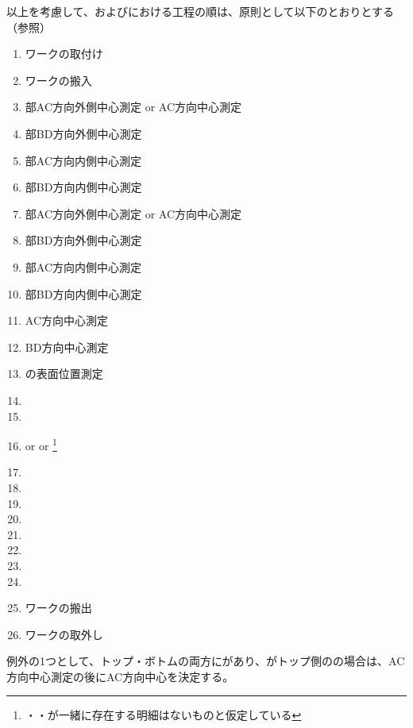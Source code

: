 \clearpage
以上を考慮して、\DMC および\MMC における工程の順は、原則として以下のとおりとする（参照）
\begin{enumerate}[label={\arabic*.}]
\item ワークの取付け
\item ワークの搬入
\item \BottomEndFace 部AC方向外側中心測定 or \BottomOutcut AC方向中心測定
\item \BottomEndFace 部BD方向外側中心測定
\item \BottomEndFace 部AC方向内側中心測定
\item \BottomEndFace 部BD方向内側中心測定
\item \TopEndFace 部AC方向外側中心測定 or \TopOutcut AC方向中心測定
\item \TopEndFace 部BD方向外側中心測定
\item \TopEndFace 部AC方向内側中心測定
\item \TopEndFace 部BD方向内側中心測定
\item \Keyway AC方向中心測定
\item \Keyway BD方向中心測定
\item \Dimple の表面位置測定
\item \DimpleMilling
\item \TopEndFacecutMilling
\item \TopOutcutMilling or \EndFaceBoringMilling or \IncutBoringMilling
\footnote{\TopOutcut・\EndFaceBoring・\IncutBoring が一緒に存在する明細はないものと仮定している}
\item \KeywayMilling
\item \TopEndFaceOutCChamferMilling
\item \TopEndFaceInCChamferMilling
\item \BottomEndFacecutMilling
\item \BottomOutcutMilling
\item \BottomEndFaceOutCChamferMilling
\item \BottomEndFaceInCChamferMilling
\item \CenterlineEndFaceDifMeasurement
\item ワークの搬出
\item ワークの取外し
\end{enumerate}
\begin{hosoku}
例外の1つとして、トップ・ボトムの両方に\Outcut があり、\OutcutCenterReference がトップ側の\OutcutAsideThickness の場合は、\TopOutcut AC方向中心測定の後に\BottomOutcut AC方向中心を決定する。
\end{hosoku}

